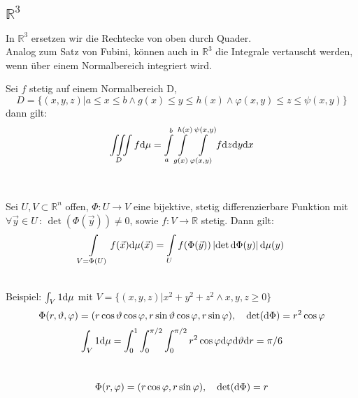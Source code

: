 	\subsection{$\mathbb{R}^3$}
		In $\mathbb{R}^3$ ersetzen wir die Rechtecke von oben durch Quader. \\
		Analog zum Satz von Fubini, können auch in $\mathbb{R}^3$ die Integrale vertauscht werden, wenn über einem Normalbereich integriert wird.\\
		\begin{theorem}
			Sei $f$ stetig auf einem Normalbereich D,
			$$ D = \{ (x,y,z) \vert a \leq x \leq b \wedge g(x) \leq y \leq h(x) \wedge \varphi(x,y) \leq z \leq \psi(x,y)\} $$
			dann gilt:
			$$ \iiint\limits_{D} f \mathrm{d} \mu = \int\limits_{a}^b  \int\limits_{g(x)}^{h(x)}  \int\limits_{\varphi(x,y)}^{\psi(x,y)} f \mathrm{d} z  \mathrm{d} y  \mathrm{d} x $$
		\end{theorem}
		\\[1em]
		\begin{theorem}[Substitution]
			Sei $U,V \subset \mathbb{R}^n$ offen, $\Phi: U \to V$ eine bijektive, stetig differenzierbare Funktion mit $\forall \vec{y} \in U \, : \, \det (\Phi(\vec{y})) \neq 0$, sowie $f: V \to \mathbb{R}$ stetig. Dann gilt:
			$$ \int\limits_{V = \Phi(U)} f(\vec{x}) \mathrm{d} \mu (\vec{x}) = \int\limits_U f(\Phi(\vec{y})) \left\vert \det \mathrm{d} \Phi(y) \right\vert \mathrm{d} \mu (y) $$
		\end{theorem}
		\begin{shortcut}\hfill\\
			Beispiel: $ \int_V 1 \mathrm{d}\mu$ mit $V = \{(x,y,z)\vert x^2 + y^2 + z^2 \wedge x,y,z \geq 0\}$
			$$\Phi(r,\vartheta, \varphi) = (r \cos \vartheta \cos \varphi, r \sin\vartheta \cos\varphi, r \sin\varphi ), \quad \det(\mathrm{d} \Phi) = r^2 \cos \varphi$$
			$$ \int_V 1 \mathrm{d}\mu = \int_0^1\int_0^{\pi/2}\int_0^{\pi/2} r^2 \cos \varphi \mathrm{d}\varphi \mathrm{d}\vartheta \mathrm{d} r = \pi / 6$$
		\end{shortcut}
		\begin{shortcut}\hfill\\
			$$\Phi(r, \varphi) = (r \cos \varphi, r \sin\varphi ), \quad \det(\mathrm{d} \Phi) = r$$
		\end{shortcut}
